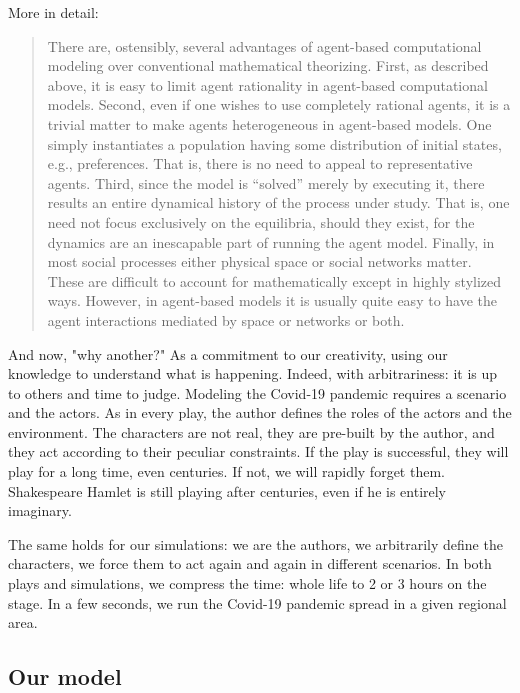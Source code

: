 \documentclass[graybox]{svmult}
\begin{document}
More in detail:
\begin{quote} 
There are, ostensibly, several advantages of agent-based computational modeling over conventional mathematical theorizing. First, as described above, it is easy to limit agent rationality in agent-based computational models. Second, even if one wishes to use completely rational agents, it is a trivial matter to make agents heterogeneous in agent-based models. One simply instantiates a population having some distribution of initial states, e.g., preferences. That is, there is no need to appeal to representative agents. Third, since the model is ``solved'' merely by executing it, there results an entire dynamical history of the process under study. That is, one need not focus exclusively on the equilibria, should they exist, for the dynamics are an inescapable part of running the agent model. Finally, in most social processes either physical space or social networks matter. These are difficult to account for mathematically except in highly stylized ways. However, in agent-based models it is usually quite easy to have the agent interactions mediated by space or networks or both.
\end{quote}

And now, "why another?" As a commitment to our creativity, using our knowledge to understand what is happening. Indeed, with arbitrariness: it is up to others and time to judge. Modeling the Covid-19 pandemic requires a scenario and the actors.
As in every play, the author defines the roles of the actors and the environment. The characters are not real, they are pre-built by the author, and they act according to their peculiar constraints. If the play is successful, they will play for a long time, even centuries. If not, we will rapidly forget them. Shakespeare Hamlet is still playing after centuries, even if he is entirely imaginary.

The same holds for our simulations: we are the authors, we arbitrarily define the characters, we force them to act again and again in different scenarios. In both plays and simulations, we compress the time: whole life to 2 or 3 hours on the stage. In a few seconds, we run the Covid-19 pandemic spread in a given regional area.

\subsection{Our model}
\label{ourModel}
\end{document}
